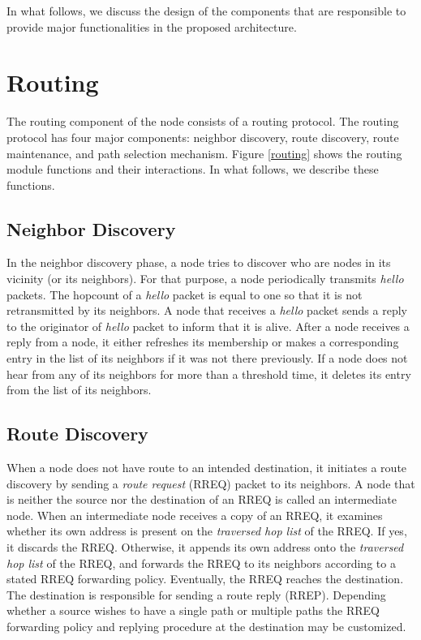 \documentclass[10pt,times,epsfig,psfig,twocolumn,algorithm,algorithmic]{IEEEtran}
\begin{document}
In what follows, we discuss the design of the components that are responsible to provide major functionalities in the proposed architecture.






\section{Routing}
The routing component of the node consists of a routing protocol. The routing protocol has four major components: neighbor discovery, route discovery, route maintenance, and path selection mechanism. Figure \ref{routing} shows the routing module functions and their interactions. In what follows, we describe these functions.

\subsection{Neighbor Discovery} 
In the neighbor discovery phase, a node tries to discover who are nodes in its vicinity (or its neighbors). For that purpose, a node periodically transmits {\em hello} packets. The hopcount of a {\em hello} packet is equal to one so that it is not retransmitted by its neighbors. A node that receives a {\em hello} packet sends a reply to the originator of {\em hello} packet to inform that it is alive. After a node receives a reply from a node, it either refreshes its membership or makes a corresponding entry in the list of its neighbors if it was not there previously. If a node does not hear from any of its neighbors for more than a threshold time, it deletes its entry from the list of its neighbors. 

\subsection{Route Discovery}
When a node does not have route to an intended destination, it initiates a route discovery by sending a {\em route request} (RREQ) packet to its neighbors. A node that is neither the source nor the destination of an RREQ is called an intermediate node. When an intermediate node receives a copy of an RREQ, it examines whether its own address is present on the {\em traversed hop list} of the RREQ. If yes, it discards the RREQ. Otherwise, it appends its own address onto the {\em traversed hop list} of the RREQ, and forwards the RREQ to its neighbors according to a stated RREQ forwarding policy. Eventually, the RREQ reaches the destination. The destination is responsible for sending a route reply (RREP). Depending whether a source wishes to have a single path or multiple paths the RREQ forwarding policy and replying procedure at the destination may be customized. 
\end{document}
